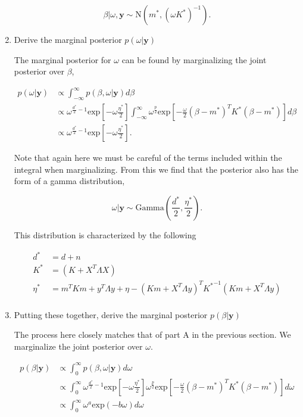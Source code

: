 \documentclass[10pt]{article}
\newcommand{\by}{\mathbf{y}}
\begin{document}
\begin{enumerate}[label=(\Alph*)]
        $$\beta | \omega, \by \sim \text{N}\left( m^*, (\omega K^*)^{-1}\right).$$

      \item Derive the marginal posterior $p(\omega | \by)$

        The marginal posterior for $\omega$ can be found by marginalizing the joint posterior over $\beta$,

        \begin{align*}
          p(\omega | \by) & \propto \int_{-\infty}^{\infty} p(\beta, \omega | \by) d \beta \\
          & \propto \omega^{\frac{d^*}{2}-1} \text{exp}\left[-\omega \frac{\eta^*}{2} \right] \int_{-\infty}^{\infty} \omega^{\frac{p}{2}} \text{exp} \left[ -\frac{\omega}{2} (\beta - m^*)^T K^* (\beta - m^*) \right] d \beta\\
          & \propto \omega^{\frac{d^*}{2}-1} \text{exp}\left[-\omega \frac{\eta^*}{2} \right].
        \end{align*}

        Note that again here we must be careful of the terms included within the integral when marginalizing. From this we find that the posterior also has the form of a gamma distribution,

        $$\omega | \by \sim \text{Gamma}\left ( \frac{d^*}{2}, \frac{\eta^*}{2}\right).$$

        This distribution is characterized by the following

        \begin{align*}
          d^* &= d+n \\
          K^* &= ( K+ X^T \Lambda X) \\
          \eta^* &= m^T K m + y^T \Lambda y + \eta - (K m + X^T \Lambda y)^T  {K^*}^{-1} (K m + X^T \Lambda y) \\
        \end{align*}

      \item Putting these together, derive the marginal posterior $p(\beta | \by) $

        The process here closely matches that of part A in the previous section. We marginalize the joint posterior over $\omega$. 

        \begin{align*}
          p(\beta | \by) &\propto \int_0^{\infty} p(\beta, \omega | \by) d \omega \\
          & \propto \int_0^{\infty} \omega^{\frac{d^*}{2} - 1} \text{exp}\left[-\omega \frac{\eta^*}{2} \right]\omega^{\frac{p}{2}} \text{exp} \left[ -\frac{\omega}{2} (\beta - m^*)^T K^* (\beta - m^*) \right] d\omega \\
          & \propto \int_0^{\infty} \omega^a \text{exp}(-b \omega) d \omega
        \end{align*}


\end{enumerate}
\end{document}
